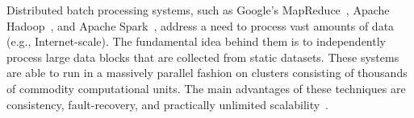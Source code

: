 


Distributed batch processing systems, such as Google's MapReduce~\cite{Dean:2008:MSD:1327452.1327492}, Apache Hadoop~\cite{hadoop2009hadoop}, and Apache Spark~\cite{Zaharia:2016:ASU:3013530.2934664}, address a need to process vast amounts of data (e.g., Internet-scale). The fundamental idea behind them is to independently process large data blocks that are collected from static datasets. These systems are able to run in a massively parallel fashion on clusters consisting of thousands of commodity computational units. The main advantages of these techniques are consistency, fault-recovery, and practically unlimited scalability~\cite{borthakur2011apache}.

